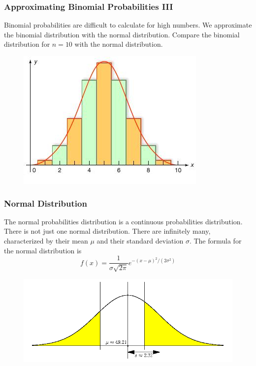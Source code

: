 \documentclass[xcolor=dvipsnames]{beamer}
\begin{document}
\begin{frame}
  \frametitle{Approximating Binomial Probabilities III}
Binomial probabilities are difficult to calculate for high numbers. We
approximate the binomial distribution with the \alert{normal distribution}.
Compare the binomial distribution for $n=10$ with the normal
distribution.
  \begin{figure}[h]
    \includegraphics[scale=.5]{./diagrams/binnorm1_ed.jpg}
  \end{figure}
\end{frame}

\begin{frame}
  \frametitle{Normal Distribution}
  The normal probabilities distribution is a \alert{continuous}
  probabilities distribution. There is not just one normal
  distribution. There are infinitely many, characterized by their
  \alert{mean $\mu$} and their \alert{standard deviation $\sigma$}.
  The formula for the normal distribution is
  \begin{equation}
    \label{eq:aengeeph}
    f(x)=\frac{1}{\sigma\sqrt{2\pi}}e^{-(x-\mu)^{2}/(2\sigma^{2})}
  \end{equation}
  \begin{figure}[h]
    \includegraphics[scale=.4]{./diagrams/qfour.png}
  \end{figure}
\end{frame}
\end{document}
